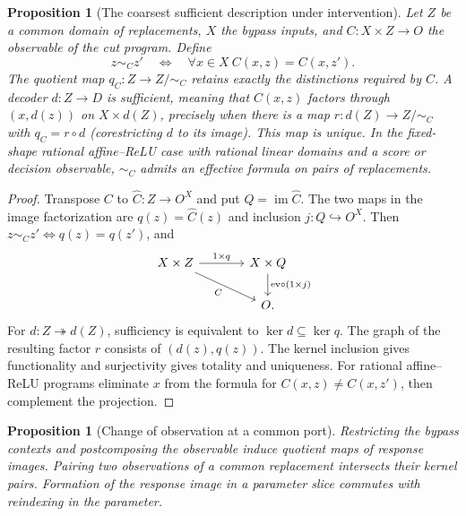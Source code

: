 \documentclass[11pt,a4paper]{article}
\newtheorem{proposition}[proposition]{Proposition}
\newtheorem{comparison}{Proposition}
\theoremstyle{definition}
\theoremstyle{remark}\newaliascnt{remark}{theorem}
\numberwithin{equation}{section}
\begin{document}
\begin{proposition}[The coarsest sufficient description under intervention]\label{prop:response-quotient}
Let $Z$ be a common domain of replacements, $X$ the bypass inputs, and $C:X\times Z\to O$ the observable of the cut program. Define
\[
 z\sim_C z'\quad\Longleftrightarrow\quad
           \forall x\in X\ C(x,z)=C(x,z').
\]
The quotient map $q_C:Z\to Z/{\sim_C}$ retains exactly the distinctions required by $C$. A decoder $d:Z\to D$ is sufficient, meaning that $C(x,z)$ factors through $(x,d(z))$ on $X\times d(Z)$, precisely when there is a map $r:d(Z)\to Z/{\sim_C}$ with $q_C=r\circ d$ (corestricting $d$ to its image). This map is unique. In the fixed-shape rational affine--ReLU case with rational linear domains and a score or decision observable, $\sim_C$ admits an effective formula on pairs of replacements.
\end{proposition}
\begin{proof}
Transpose \(C\) to \(\widehat C:Z\to O^X\) and put \(Q=\operatorname{im}\widehat C\). The two maps in the image factorization are \(q(z)=\widehat C(z)\) and inclusion \(j:Q\hookrightarrow O^X\). Then \(z\sim_C z'\iff q(z)=q(z')\), and
\[
\begin{tikzcd}[column sep=large]
 X\times Z\arrow[r,"1\times q"]\arrow[dr,"C"']&
 X\times Q\arrow[d,"{\mathrm{ev}\circ(1\times j)}"]\\
 &O .
\end{tikzcd}
\]
For \(d:Z\twoheadrightarrow d(Z)\), sufficiency is equivalent to \(\ker d\subseteq\ker q\). The graph of the resulting factor \(r\) consists of \((d(z),q(z))\). The kernel inclusion gives functionality and surjectivity gives totality and uniqueness. For rational affine--ReLU programs eliminate \(x\) from the formula for \(C(x,z)\ne C(x,z')\), then complement the projection.

\end{proof}
\begin{comparison}[Change of observation at a common port]\label{comp:response}
Restricting the bypass contexts and postcomposing the observable induce quotient maps of response images. Pairing two observations of a common replacement intersects their kernel pairs. Formation of the response image in a parameter slice commutes with reindexing in the parameter.
\end{comparison}
\end{document}
